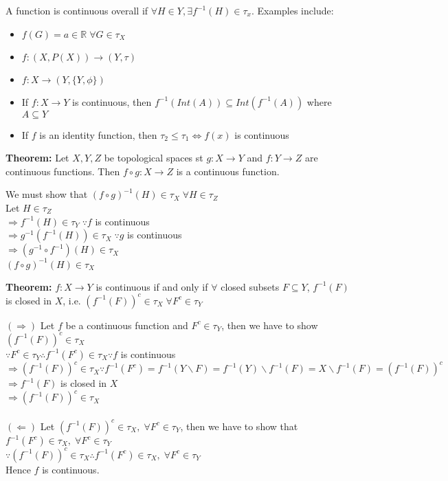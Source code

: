 \documentclass{article}
\begin{document}
A function is continuous overall if $\forall H \in Y, \exists f^{-1}(H) \in \tau_x$. Examples include: 
\begin{itemize}
	\item $f(G) = a \in \mathbb{R} \; \forall G \in \tau_X$
	\item $f: (X, P(X)) \rightarrow (Y, \tau)$
	\item $f: X \rightarrow (Y, \{Y, \phi\})$
	\item If $f: X \rightarrow Y$ is continuous, then $f^{-1}(Int(A)) \subseteq Int(f^{-1}(A))$ where $A \subseteq Y$
	\item If $f$ is an identity function, then $\tau_2 \leq \tau_1 \iff f(x)$ is continuous
\end{itemize}

\textbf{Theorem:} Let $X,Y,Z$ be topological spaces st $g:X \rightarrow Y$ and $f:Y \rightarrow Z$ are continuous functions. Then $f \circ g: X \rightarrow Z$ is a continuous function.
\begin{tcolorbox}[colback=lightgray!10,colframe=lightgray!10, fontupper=\linespread{1.5}\selectfont]
	We must show that $(f \circ g)^{-1}(H) \in \tau_X \; \forall H \in \tau_Z$ \\
	Let $H \in \tau_Z$ \\
	$\Rightarrow f^{-1}(H) \in \tau_Y \; \because f$ is continuous \\
	$\Rightarrow g^{-1}(f^{-1}(H)) \in \tau_X \; \because g$ is continuous \\
	$\Rightarrow (g^{-1} \circ f^{-1})(H) \in \tau_X$ \\
	$(f \circ g)^{-1}(H) \in \tau_X$
\end{tcolorbox}

\textbf{Theorem:} $f: X \rightarrow Y$ is continuous if and only if $\forall$ closed subsets $F \subseteq Y$, $f^{-1}(F)$ is closed in $X$, i.e. $(f^{-1}(F))^c \in \tau_X \; \forall F^c \in \tau_Y$
\begin{tcolorbox}[colback=lightgray!10,colframe=lightgray!10, fontupper=\linespread{1.5}\selectfont]
	$(\Rightarrow)$ Let $f$ be a continuous function and $F^c \in \tau_Y$, then we have to show $(f^{-1}(F))^c \in \tau_X $ \\	
	$\because F^c \in \tau_Y \therefore f^{-1}(F^c) \in \tau_X \because f$ is continuous \\
	$\Rightarrow (f^{-1}(F))^c \in \tau_X \because f^{-1}(F^c) = f^{-1}(Y \backslash F) = f^{-1}(Y) \backslash f^{-1}(F) = X \backslash f^{-1}(F) = (f^{-1}(F))^c$ \\	
	$\Rightarrow f^{-1}(F)$ is closed in $X$ \\	
	$\Rightarrow (f^{-1}(F))^c \in \tau_X$ \\\\	
	$(\Leftarrow)$ Let $(f^{-1}(F))^c \in \tau_X , \; \forall F^c \in \tau_Y$, then we have to show that $f^{-1}(F^c) \in \tau_X, \; \forall F^c \in \tau_Y$ \\
	$\because (f^{-1}(F))^c \in \tau_X \therefore f^{-1}(F^c) \in \tau_X, \; \forall F^c \in \tau_Y$ \\	
	Hence $f$ is continuous.
\end{tcolorbox}
\end{document}
